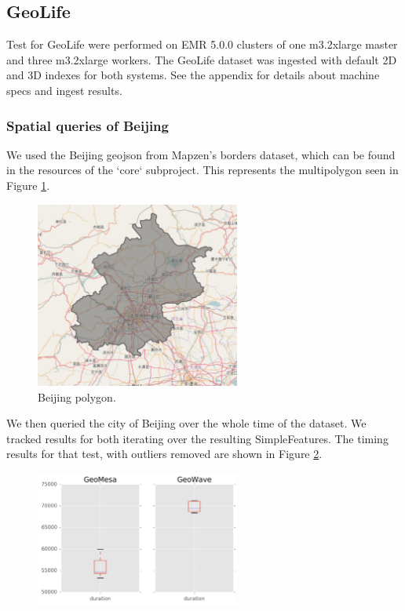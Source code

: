 \subsection{ GeoLife}

Test for GeoLife were performed on EMR 5.0.0 clusters of one m3.2xlarge master and three m3.2xlarge workers.
The GeoLife dataset was ingested with default 2D and 3D indexes for both systems.
See the appendix for details about machine specs and ingest results.

\subsubsection{Spatial queries of Beijing}

We used the Beijing geojson from Mapzen's borders dataset, which can be found in the resources of the `core` subproject.
This represents the multipolygon seen in Figure \ref{beijingpolygon}.

\begin{figure}[h!tb]
  \centering
  \includegraphics[width=0.60\textwidth]{../docs/img/beijing-poly.png}
  \caption{Beijing polygon.}
  \label{beijingpolygon}
\end{figure}

We then queried the city of Beijing over the whole time of the dataset.
We tracked results for both iterating over the resulting SimpleFeatures.
The timing results for that test, with outliers removed are shown in Figure \ref{beijingiterate}.

\begin{figure}[h!tb]
  \centering
  \includegraphics[width=0.60\textwidth]{../docs/img/geolife-beijing-iterate.png}
  \label{beijingiterate}
\end{figure}

